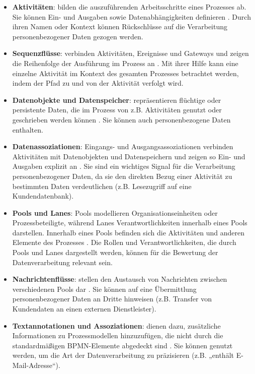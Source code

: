 \begin{itemize}
    \item \textbf{Aktivitäten}: bilden die auszuführenden Arbeitsschritte eines Prozesses ab. Sie können Ein- und Ausgaben sowie Datenabhängigkeiten definieren \cite{omgbpmn}. Durch ihren Namen oder Kontext können Rückschlüsse auf die Verarbeitung personenbezogener Daten gezogen werden.
    \item \textbf{Sequenzflüsse}: verbinden Aktivitäten, Ereignisse und Gateways und zeigen die Reihenfolge der Ausführung im Prozess an \cite{omgbpmn}. Mit ihrer Hilfe kann eine einzelne Aktivität im Kontext des gesamten Prozesses betrachtet werden, indem der Pfad zu und von der Aktivität verfolgt wird.
    \item \textbf{Datenobjekte und Datenspeicher}: repräsentieren flüchtige oder persistente Daten, die im Prozess von z.B. Aktivitäten genutzt oder geschrieben werden können \cite{omgbpmn}. Sie können auch personenbezogene Daten enthalten.
    \item \textbf{Datenassoziationen}: Eingangs- und Ausgangsassoziationen verbinden Aktivitäten mit Datenobjekten und Datenspeichern und zeigen so Ein- und Ausgaben explizit an \cite{omgbpmn}. Sie sind ein wichtiges Signal für die Verarbeitung personenbezogener Daten, da sie den direkten Bezug einer Aktivität zu bestimmten Daten verdeutlichen (z.B. Lesezugriff auf eine Kundendatenbank).
    \item \textbf{Pools und Lanes}: Pools modellieren Organisationseinheiten oder Prozessbeteiligte, während Lanes Verantwortlichkeiten innerhalb eines Pools darstellen. Innerhalb eines Pools befinden sich die Aktivitäten und anderen Elemente des Prozesses \cite{omgbpmn}. Die Rollen und Verantwortlichkeiten, die durch Pools und Lanes dargestellt werden, können für die Bewertung der Datenverarbeitung relevant sein.
    \item \textbf{Nachrichtenflüsse}: stellen den Austausch von Nachrichten zwischen verschiedenen Pools dar \cite{omgbpmn}. Sie können auf eine Übermittlung personenbezogener Daten an Dritte hinweisen (z.B. Transfer von Kundendaten an einen externen Dienstleister).
    \item \textbf{Textannotationen und Assoziationen}: dienen dazu, zusätzliche Informationen zu Prozessmodellen hinzuzufügen, die nicht durch die standardmäßigen BPMN-Elemente abgedeckt sind \cite{omgbpmn}. Sie können genutzt werden, um die Art der Datenverarbeitung zu präzisieren (z.B. „enthält E-Mail-Adresse“).
\end{itemize}

